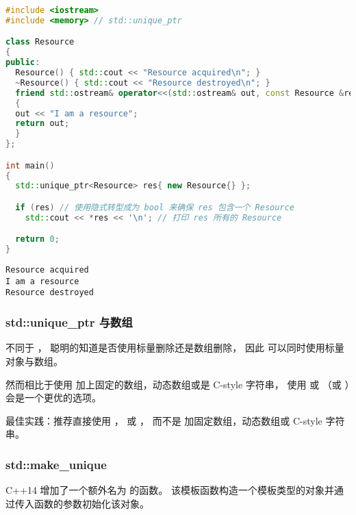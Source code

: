 \documentclass[../../LearnCpp.tex]{subfiles}
\begin{document}
\begin{lstlisting}[language=C++]
#include <iostream>
#include <memory> // std::unique_ptr

class Resource
{
public:
  Resource() { std::cout << "Resource acquired\n"; }
  ~Resource() { std::cout << "Resource destroyed\n"; }
  friend std::ostream& operator<<(std::ostream& out, const Resource &res)
  {
  out << "I am a resource";
  return out;
  }
};

int main()
{
  std::unique_ptr<Resource> res{ new Resource{} };

  if (res) // 使用隐式转型成为 bool 来确保 res 包含一个 Resource
    std::cout << *res << '\n'; // 打印 res 所有的 Resource

  return 0;
}
\end{lstlisting}

\begin{lstlisting}
Resource acquired
I am a resource
Resource destroyed
\end{lstlisting}

\subsubsection*{std::unique\_ptr 与数组}

不同于 ， 聪明的知道是否使用标量删除还是数组删除，
因此  可以同时使用标量对象与数组。

然而相比于使用  加上固定的数组，动态数组或是 C-style 字符串，
使用  或 （或 ）会是一个更优的选项。

最佳实践：推荐直接使用 ， 或 ，
而不是  加固定数组，动态数组或 C-style 字符串。

\subsubsection*{std::make\_unique}

C++14 增加了一个额外名为  的函数。
该模板函数构造一个模板类型的对象并通过传入函数的参数初始化该对象。
\end{document}
